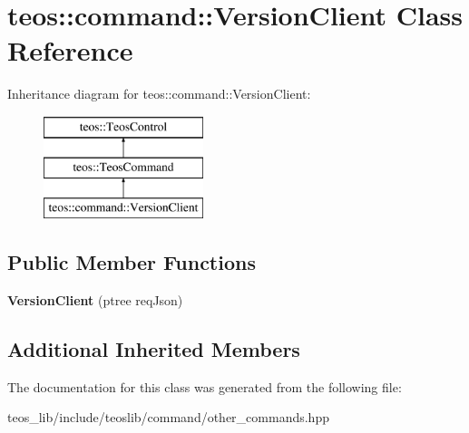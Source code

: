 \hypertarget{classteos_1_1command_1_1_version_client}{}\section{teos\+:\+:command\+:\+:Version\+Client Class Reference}
\label{classteos_1_1command_1_1_version_client}
Inheritance diagram for teos\+:\+:command\+:\+:Version\+Client\+:\begin{figure}[H]
\begin{center}
\leavevmode
\includegraphics[height=3.000000cm]{classteos_1_1command_1_1_version_client}
\end{center}
\end{figure}
\subsection*{Public Member Functions}
\begin{DoxyCompactItemize}
\item 
\mbox{\label{classteos_1_1command_1_1_version_client_a90072a3531e0e9064ff5933fea90807e}} 
{\bfseries Version\+Client} (ptree req\+Json)
\end{DoxyCompactItemize}
\subsection*{Additional Inherited Members}


The documentation for this class was generated from the following file\+:\begin{DoxyCompactItemize}
\item 
teos\+\_\+lib/include/teoslib/command/other\+\_\+commands.\+hpp\end{DoxyCompactItemize}
